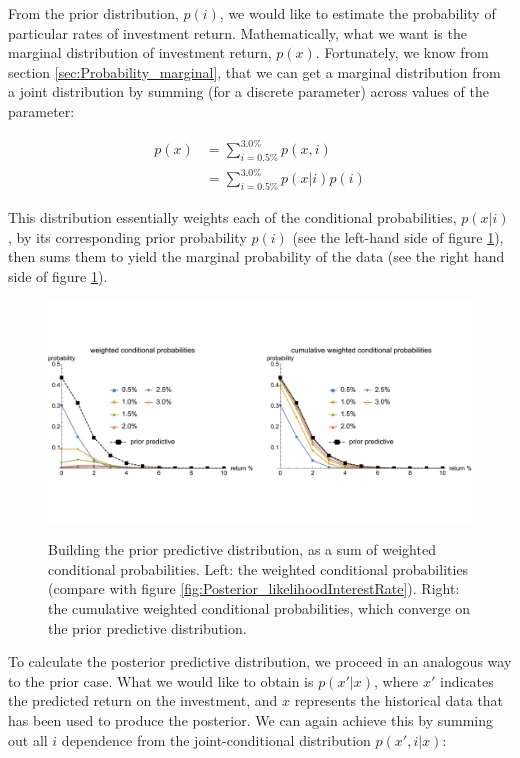 \documentclass[11pt,fullpage]{book}
\begin{document}
From the prior distribution, $p(i)$, we would like to estimate the probability of particular rates of investment return. Mathematically, what we want is the marginal distribution of investment return, $p(x)$. Fortunately, we know from section \ref{sec:Probability_marginal}, that we can get a marginal distribution from a joint distribution by summing (for a discrete parameter) across values of the parameter:

\begin{equation}\label{eq:Posterior_InterestpriorPredictiveDistribution}
\begin{align}
p(x) &= \sum\limits_{i=0.5\%}^{3.0\%} p(x,i)\\
&= \sum\limits_{i=0.5\%}^{3.0\%} p(x|i) p(i)
\end{align}
\end{equation}

This distribution essentially weights each of the conditional probabilities, $p(x|i)$, by its corresponding prior probability $p(i)$ (see the left-hand side of figure \ref{fig:Posterior_priorBuildInterestRate}), then sums them to yield the marginal probability of the data (see the right hand side of figure \ref{fig:Posterior_priorBuildInterestRate}).

\begin{figure}
\centering
\scalebox{0.4} 
{\includegraphics{Posterior_priorBuildInterestRate.pdf}}
\caption{Building the prior predictive distribution, as a sum of weighted conditional probabilities. Left: the weighted conditional probabilities (compare with figure \ref{fig:Posterior_likelihoodInterestRate}). Right: the cumulative weighted conditional probabilities, which converge on the prior predictive distribution.}\label{fig:Posterior_priorBuildInterestRate}
\end{figure}

To calculate the posterior predictive distribution, we proceed in an analogous way to the prior case. What we would like to obtain is $p(x'|x)$, where $x'$ indicates the predicted return on the investment, and $x$ represents the historical data that has been used to produce the posterior. We can again achieve this by summing out all $i$ dependence from the joint-conditional distribution $p(x',i|x)$:
\end{document}
